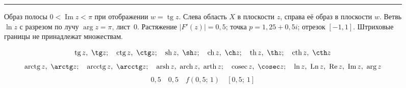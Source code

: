 
\begin{figure}[h]
  \centering
  \rule{0.6\linewidth}{0.25\linewidth}
  \caption{Образ полосы $0<\operatorname{Im} z<\pi$ при отображении $w=\operatorname{tg} z$.
    Слева область $X$ в плоскости $z$, справа её образ в плоскости $w$.
    Ветвь $\ln z$ с разрезом по лучу $\arg z=\pi$, лист~$0$.
    Растяжение $|F'(z)|=0{,}5$; точка $p=1{,}25+0{,}5i$; отрезок $[-1,1]$.
    Штриховые границы не принадлежат множествам.}
\end{figure}
\[
\operatorname{tg} z,\ \tg z;\quad \operatorname{ctg} z,\ \ctg z;\quad \operatorname{sh} z,\ \sh z;\quad \operatorname{ch} z,\ \ch z;\quad
\operatorname{th} z,\ \th z;\quad \operatorname{cth} z,\ \cth z
\]
\[
\operatorname{arctg} z,\ \arctg z;\quad \operatorname{arcctg} z,\ \arcctg z;\quad \operatorname{arsh} z,\ \operatorname{arch} z,\ \operatorname{arth} z;\quad
\operatorname{cosec} z,\ \cosec z;\quad \ln z,\ \operatorname{Ln} z,\ \operatorname{Re} z,\ \operatorname{Im} z,\ \arg z
\]
\[ 0,5 \quad 0{,}5 \quad f(0{,}5;\,1) \quad [0{,}5;\ 1] \]

